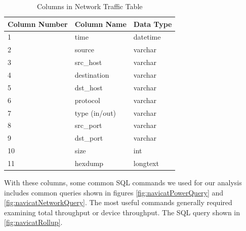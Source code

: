 \begin{table}[H]
    \centering
    \caption{Columns in Network Traffic Table}
    \begin{tabular}{@{}lll@{}}
    \toprule
    Column Number & Column Name & Data Type \\ \midrule
    1             & time        & datetime  \\
    2             & source      & varchar   \\
    3             & src\_host   & varchar   \\
    4             & destination & varchar   \\
    5             & dst\_host   & varchar   \\
    6             & protocol    & varchar   \\
    7             & type (in/out)       & varchar   \\
    8             & src\_port   & varchar   \\
    9             & dst\_port   & varchar   \\
    10            & size        & int       \\
    11            & hexdump     & longtext  \\ \bottomrule
    \end{tabular}
    \label{tab:netcol}
    \end{table}

With these columns, some common SQL commands we used for our analysis includes common queries shown in figures \ref{fig:navicatPowerQuery} and \ref{fig:navicatNetworkQuery}. The most useful commands generally required examining total throughput or device throughput. The SQL query shown in \ref{fig:navicatRollup}.

